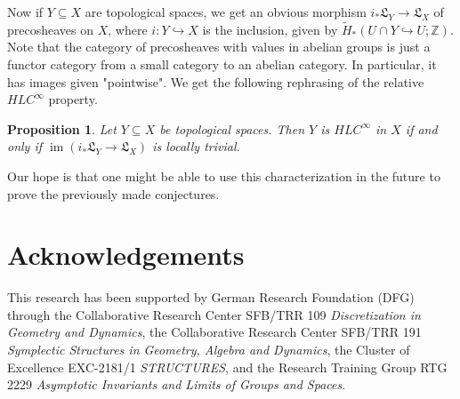 \documentclass{amsart}
\theoremstyle{plain}
\newtheorem{prop}[thm]{Proposition}
\theoremstyle{definition}
\DeclareMathOperator{\im}{im}
\begin{document}
Now if $Y\subseteq X$ are topological spaces, we get an obvious morphism $i_*\mathfrak{L}_Y\to\mathfrak{L}_X$ of precosheaves on $X$, where $i\colon Y\hookrightarrow X$ is the inclusion, given by $\tilde{H}_*(U\cap Y\hookrightarrow U;\mathbb{Z})$. Note that the category of precosheaves with values in abelian groups is just a functor category from a small category to an abelian category. In particular, it has images given "pointwise". We get the following rephrasing of the relative $HLC^{\infty}$ property.

\begin{prop}
Let $Y\subseteq X$ be topological spaces. Then $Y$ is $HLC^{\infty}$ in $X$ if and only if $\im(i_*\mathfrak{L}_Y\to\mathfrak{L}_X)$ is locally trivial.
\end{prop}

Our hope is that one might be able to use this characterization in the future to prove the previously made conjectures.



\section*{Acknowledgements}
This research has been supported by German Research Foundation (DFG) through the Collaborative Research Center SFB/TRR 109 \emph{Discretization in Geometry and Dynamics}, the Collaborative Research Center SFB/TRR 191 \emph{Symplectic Structures in Geometry, Algebra and Dynamics}, the Cluster of Excellence EXC-2181/1 \emph{STRUCTURES}, and the Research Training Group RTG 2229 \emph{Asymptotic Invariants and Limits of Groups and Spaces}.




\todos
\end{document}
